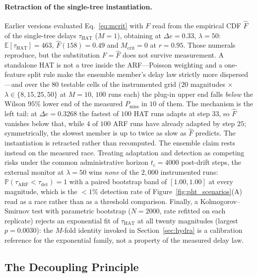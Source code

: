 \documentclass[10pt,conference]{IEEEtran}
\theoremstyle{definition}
\newcommand{\SixSeeds}{100}                  %
\newcommand{\SixCanonDeltaE}{0.3268}         %
\begin{document}
\paragraph{Retraction of the single-tree instantiation.}
Earlier versions evaluated Eq.~\eqref{eq:mcrit} with $F$ read from the empirical CDF $\widehat{F}$ of the single-tree delays $\tau_{\mathrm{HAT}}$ ($M = 1$), obtaining at $\Delta e = 0.33$, $\lambda = 50$: $\mathbb{E}[\tau_{\mathrm{HAT}}] = 463$, $\widehat{F}(158) = 0.49$ and $M_{\mathrm{crit}} = 0$ at $r = 0.95$. Those numerals reproduce, but the substitution $F = \widehat{F}$ does not survive measurement. A standalone HAT is not a tree inside the ARF---Poisson weighting and a one-feature split rule make the ensemble member's delay law strictly more dispersed---and over the $80$ testable cells of the instrumented grid ($20$ magnitudes $\times$ $\lambda \in \{8, 15, 25, 50\}$ at $M = 10$, $\SixSeeds$ runs each) the plug-in upper end falls \emph{below} the Wilson $95\%$ lower end of the measured $P_{\mathrm{miss}}$ in $10$ of them. The mechanism is the left tail: at $\Delta e = \SixCanonDeltaE$ the fastest of $\SixSeeds$ HAT runs adapts at step $33$, so $\widehat{F}$ vanishes below that, while $4$ of $\SixSeeds$ ARF runs have already adapted by step $25$; symmetrically, the slowest member is up to twice as slow as $\widehat{F}$ predicts. The instantiation is retracted rather than recomputed.
The ensemble claim rests instead on the measured race. Treating adaptation and detection as competing risks under the common administrative horizon $t_c = 4000$ post-drift steps, the external monitor at $\lambda = 50$ wins \emph{none} of the $2{,}000$ instrumented runs: $\mathbb{P}(\tau_{\mathrm{ARF}} < \tau_{\mathrm{det}}) = 1$ with a paired bootstrap band of $[1.00, 1.00]$ at every magnitude, which is the ${<}1\%$ detection rate of Figure~\ref{fig:pht_scenarios}(A) read as a race rather than as a threshold comparison. Finally, a Kolmogorov--Smirnov test with parametric bootstrap ($N{=}2000$, rate refitted on each replicate) rejects an exponential fit of $\tau_{\mathrm{HAT}}$ at all twenty magnitudes (largest $p = 0.0030$): the $M$-fold identity invoked in Section~\ref{sec:hydra} is a calibration reference for the exponential family, not a property of the measured delay law.

\subsection{The Decoupling Principle}\label{sec:decoupling}
\end{document}
